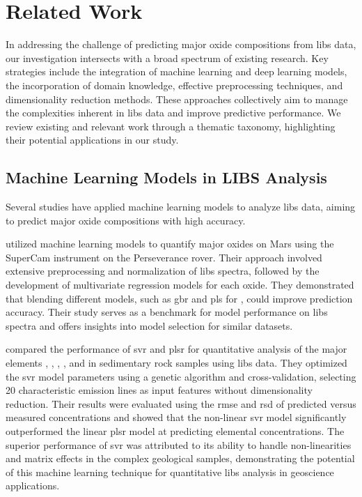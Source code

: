 \section{Related Work}\label{sec:related-work}
In addressing the challenge of predicting major oxide compositions from \gls{libs} data, our investigation intersects with a broad spectrum of existing research.
Key strategies include the integration of machine learning and deep learning models, the incorporation of domain knowledge, effective preprocessing techniques, and dimensionality reduction methods.
These approaches collectively aim to manage the complexities inherent in \gls{libs} data and improve predictive performance.
We review existing and relevant work through a thematic taxonomy, highlighting their potential applications in our study.

\subsection{Machine Learning Models in LIBS Analysis}
Several studies have applied machine learning models to analyze \gls{libs} data, aiming to predict major oxide compositions with high accuracy.

\citet{andersonPostlandingMajorElement2022} utilized machine learning models to quantify major oxides on Mars using the SuperCam instrument on the Perseverance rover.
Their approach involved extensive preprocessing and normalization of \gls{libs} spectra, followed by the development of multivariate regression models for each oxide.
They demonstrated that blending different models, such as \gls{gbr} and \gls{pls} for , could improve prediction accuracy.
Their study serves as a benchmark for model performance on \gls{libs} spectra and offers insights into model selection for similar datasets.

\citet{shi_svr_libs_2015} compared the performance of \gls{svr} and \gls{plsr} for quantitative analysis of the major elements , , , , and  in sedimentary rock samples using \gls{libs} data.
They optimized the \gls{svr} model parameters using a genetic algorithm and cross-validation, selecting 20 characteristic emission lines as input features without dimensionality reduction.
Their results were evaluated using the \gls{rmse} and \gls{rsd} of predicted versus measured concentrations and showed that the non-linear \gls{svr} model significantly outperformed the linear \gls{plsr} model at predicting elemental concentrations.
The superior performance of \gls{svr} was attributed to its ability to handle non-linearities and matrix effects in the complex geological samples, demonstrating the potential of this machine learning technique for quantitative \gls{libs} analysis in geoscience applications.

